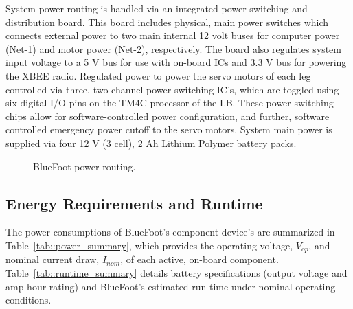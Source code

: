 			System power routing is handled via an integrated power switching and distribution board. This board includes physical, main power switches which connects external power to two main internal 12 volt buses for  computer power (Net-1) and motor power (Net-2), respectively. The board also regulates system input voltage to a 5 V bus for use with on-board ICs and 3.3 V bus for powering the XBEE radio. Regulated power to power the servo motors of each leg controlled via three, two-channel power-switching IC's, which are toggled using six digital I/O pins on the TM4C processor of the LB. These power-switching chips allow for software-controlled power configuration, and further, software controlled emergency power cutoff to the servo motors. System main power is supplied via four 12 V (3 cell), 2 Ah Lithium Polymer battery packs.
				\begin{figure}[h!]
					\centering
					\caption{BlueFoot power routing.}
					\label{fig::dev_diagram}
				\end{figure}
		
			\newpage
			\subsection{Energy Requirements and Runtime}

			
			The power consumptions of BlueFoot's component device's are summarized in Table~\ref{tab::power_summary}, which provides the operating voltage, $V_{op}$, and nominal current draw, $I_{nom}$, of each active, on-board component. Table~\ref{tab::runtime_summary} details battery specifications (output voltage and amp-hour rating) and BlueFoot's estimated run-time under nominal operating conditions.
		
